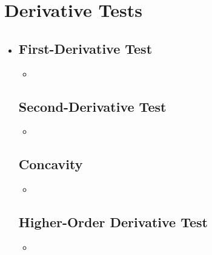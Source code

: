 \section{Derivative Tests}
\begin{itemize}
  \item []

  \subsection{First-Derivative Test}
  \begin{itemize}
    \item
  \end{itemize}

  \subsection{Second-Derivative Test}
  \begin{itemize}
    \item
  \end{itemize}

  \subsection{Concavity}
  \begin{itemize}
    \item
  \end{itemize}

  \subsection{Higher-Order Derivative Test}
  \begin{itemize}
    \item
  \end{itemize}

\end{itemize}

